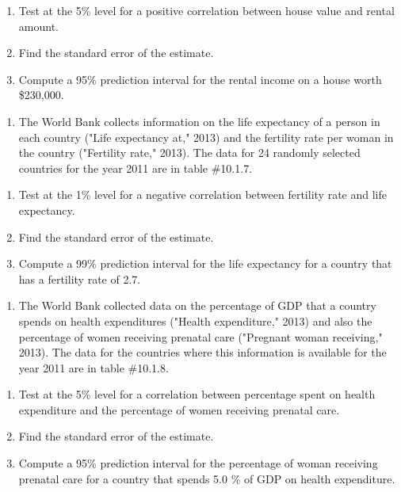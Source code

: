 \documentclass[]{book}
\providecommand{\tightlist}{%
  \setlength{\itemsep}{0pt}\setlength{\parskip}{0pt}}
\begin{document}
\begin{enumerate}
\def\labelenumi{\alph{enumi}.}
\item
  Test at the 5\% level for a positive correlation between house value and rental amount.
\item
  Find the standard error of the estimate.
\item
  Compute a 95\% prediction interval for the rental income on a house worth \$230,000.
\end{enumerate}

\begin{enumerate}
\def\labelenumi{\arabic{enumi}.}
\setcounter{enumi}{2}
\tightlist
\item
  The World Bank collects information on the life expectancy of a person in each country ("Life expectancy at," 2013) and the fertility rate per woman in the country ("Fertility rate," 2013). The data for 24 randomly selected countries for the year 2011 are in table \#10.1.7.
\end{enumerate}

\begin{enumerate}
\def\labelenumi{\alph{enumi}.}
\item
  Test at the 1\% level for a negative correlation between fertility rate and life expectancy.
\item
  Find the standard error of the estimate.
\item
  Compute a 99\% prediction interval for the life expectancy for a country that has a fertility rate of 2.7.
\end{enumerate}

\begin{enumerate}
\def\labelenumi{\arabic{enumi}.}
\setcounter{enumi}{3}
\tightlist
\item
  The World Bank collected data on the percentage of GDP that a country spends on health expenditures ("Health expenditure," 2013) and also the percentage of women receiving prenatal care ("Pregnant woman receiving," 2013). The data for the countries where this information is available for the year 2011 are in table \#10.1.8.
\end{enumerate}

\begin{enumerate}
\def\labelenumi{\alph{enumi}.}
\item
  Test at the 5\% level for a correlation between percentage spent on health expenditure and the percentage of women receiving prenatal care.
\item
  Find the standard error of the estimate.
\item
  Compute a 95\% prediction interval for the percentage of woman receiving prenatal care for a country that spends 5.0 \% of GDP on health expenditure.
\end{enumerate}
\end{document}

